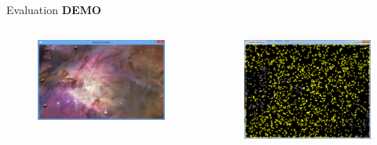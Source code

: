\documentclass{beamer}
\begin{document}
\begin{frame}[fragile]{Evaluation}
\textbf{DEMO}

\begin{columns}[c]
\column{1.5in}
\begin{figure}
\includegraphics[scale=0.15]{Pics/asteroid_shooter.png}
\end{figure}
\begin{figure}
\includegraphics[scale=0.15]{Pics/cellular_automaton.png}
\end{figure}


\end{columns}
\end{frame}
\end{document}
